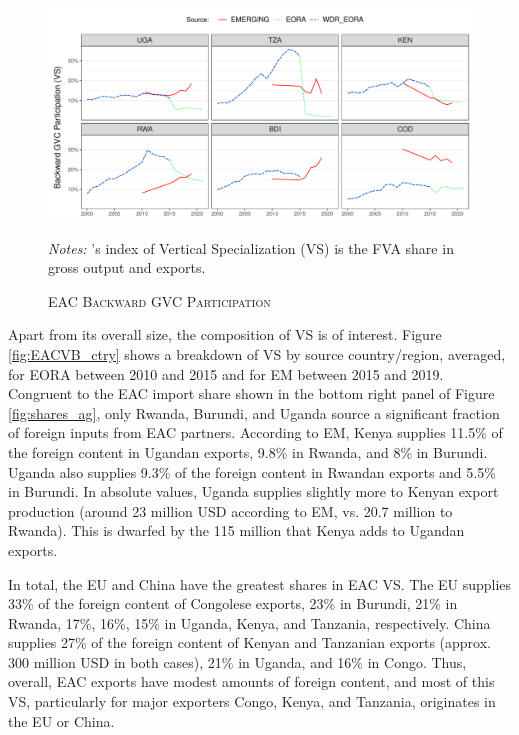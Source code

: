 \documentclass[a4paper]{article}
\begin{document}
\begin{figure}[h!] 
\centering
\caption{\label{fig:EACVB_ag_ts}\textsc{EAC Backward GVC Participation}}
\includegraphics[width=1\textwidth, trim= {0 0 0 0}, clip]{"VA_shares_ag_ts.pdf"} \raggedright
\scriptsize
\emph{Notes:} \citet{hummels2001nature}'s index of Vertical Specialization (VS) is the FVA share in gross output and exports. 
\end{figure}
\FloatBarrier

Apart from its overall size, the composition of VS is of interest. Figure \ref{fig:EACVB_ctry} shows a breakdown of VS by source country/region, averaged, for EORA between 2010 and 2015 and for EM between 2015 and 2019. Congruent to the EAC import share shown in the bottom right panel of Figure \ref{fig:shares_ag}, only Rwanda, Burundi, and Uganda source a significant fraction of foreign inputs from EAC partners. According to EM, Kenya supplies 11.5\% of the foreign content in Ugandan exports, 9.8\% in Rwanda, and 8\% in Burundi. Uganda also supplies 9.3\% of the foreign content in Rwandan exports and 5.5\% in Burundi. In absolute values, Uganda supplies slightly more to Kenyan export production (around 23 million USD according to EM, vs. 20.7 million to Rwanda). This is dwarfed by the 115 million that Kenya adds to Ugandan exports. \newline 

In total, the EU and China have the greatest shares in EAC VS. The EU supplies 33\% of the foreign content of Congolese exports, 23\% in Burundi, 21\% in Rwanda, 17\%, 16\%, 15\% in Uganda, Kenya, and Tanzania, respectively. China supplies 27\% of the foreign content of Kenyan and Tanzanian exports (approx. 300 million USD in both cases), 21\% in Uganda, and 16\% in Congo. Thus, overall, EAC exports have modest amounts of foreign content, and most of this VS, particularly for major exporters Congo, Kenya, and Tanzania, originates in the EU or China. 
\end{document}
